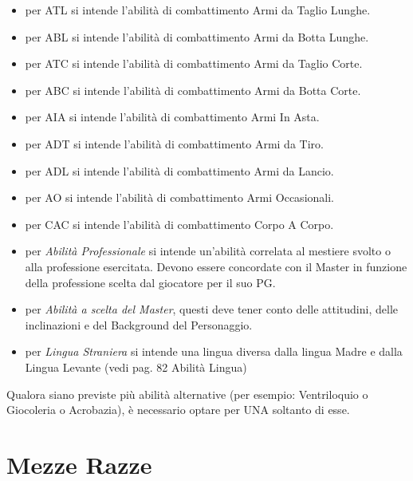 \begin{itemize}\itemsep -3pt  
\item per ATL si intende l'abilit\`a di combattimento Armi da Taglio
  Lunghe.
\item per ABL si intende l'abilit\`a di combattimento Armi da Botta
  Lunghe.
\item per ATC si intende l'abilit\`a di combattimento Armi da Taglio
  Corte.
\item per ABC si intende l'abilit\`a di combattimento Armi da Botta
  Corte.
\item per AIA si intende l'abilit\`a di combattimento Armi In Asta.
\item per ADT si intende l'abilit\`a di combattimento Armi da Tiro.
\item per ADL si intende l'abilit\`a di combattimento Armi da Lancio.
\item per AO si intende l'abilit\`a di combattimento Armi Occasionali.
\item per CAC si intende l'abilit\`a di combattimento Corpo A Corpo.
\item per \emph{Abilit\`a Professionale} si intende un'abilit\`a
  correlata al mestiere svolto o alla professione esercitata. Devono
  essere concordate con il Master in funzione della professione scelta
  dal giocatore per il suo PG.
    
\item per \emph{Abilit\`a a scelta del Master}, questi deve tener
  conto delle attitudini, delle inclinazioni e del Background del
  Personaggio.
    
\item per \emph{Lingua Straniera} si intende una lingua diversa dalla
  lingua Madre e dalla Lingua Levante (vedi pag. 82 Abilit\`a Lingua) 

\end{itemize}

\iffullversion
{}
\fi

Qualora siano previste pi\`u abilit\`a alternative (per esempio:
Ventriloquio o Giocoleria o Acrobazia), \`e necessario optare per UNA
soltanto di esse.




\iffullversion
\section*{Mezze Razze}

